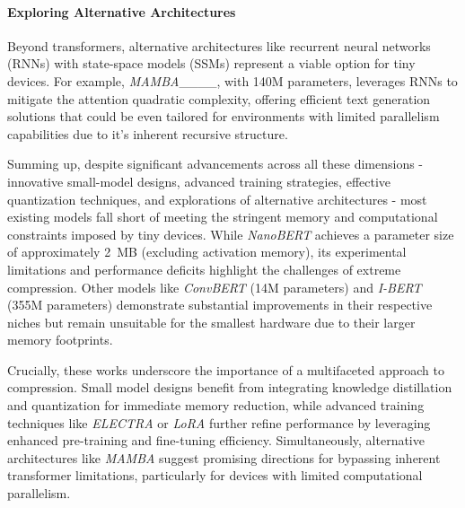 \paragraph{Exploring Alternative Architectures} 
Beyond transformers, alternative architectures like recurrent neural networks (RNNs) with state-space models (SSMs) represent a viable option for tiny devices. For example, \textit{MAMBA}____, with 140M parameters, leverages RNNs to mitigate the attention quadratic complexity, offering efficient text generation solutions that could be even tailored for environments with limited parallelism capabilities due to it's inherent recursive structure.

\vspace{5mm}

Summing up, despite significant advancements across all these dimensions - innovative small-model designs, advanced training strategies, effective quantization techniques, and explorations of alternative architectures - most existing models fall short of meeting the stringent memory and computational constraints imposed by tiny devices. While \textit{NanoBERT} achieves a parameter size of approximately 2~MB (excluding activation memory), its experimental limitations and performance deficits highlight the challenges of extreme compression. Other models like \textit{ConvBERT} (14M parameters) and \textit{I-BERT} (355M parameters) demonstrate substantial improvements in their respective niches but remain unsuitable for the smallest hardware due to their larger memory footprints.

Crucially, these works underscore the importance of a multifaceted approach to compression. Small model designs benefit from integrating knowledge distillation and quantization for immediate memory reduction, while advanced training techniques like \textit{ELECTRA} or \textit{LoRA} further refine performance by leveraging enhanced pre-training and fine-tuning efficiency. Simultaneously, alternative architectures like \textit{MAMBA} suggest promising directions for bypassing inherent transformer limitations, particularly for devices with limited computational parallelism.


